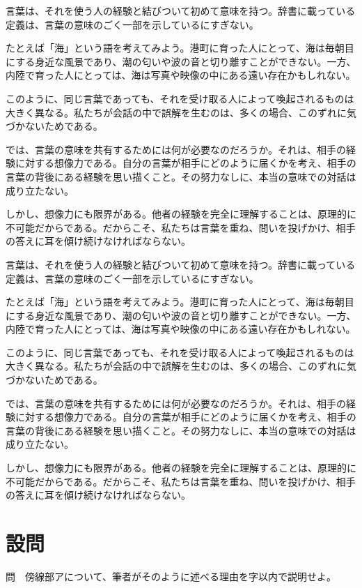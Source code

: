\documentclass[tate,paper=b5,fontsize=10pt,twocolumn]{jlreq}
\begin{document}
言葉は、それを使う人の経験と結びついて初めて意味を持つ。辞書に載っている定義は、言葉の意味のごく一部を示しているにすぎない。

たとえば「海」という語を考えてみよう。港町に育った人にとって、海は毎朝目にする身近な風景であり、潮の匂いや波の音と切り離すことができない。一方、内陸で育った人にとっては、海は写真や映像の中にある遠い存在かもしれない。

このように、同じ言葉であっても、それを受け取る人によって喚起されるものは大きく異なる。私たちが会話の中で誤解を生むのは、多くの場合、このずれに気づかないためである。

では、言葉の意味を共有するためには何が必要なのだろうか。それは、相手の経験に対する想像力である。自分の言葉が相手にどのように届くかを考え、相手の言葉の背後にある経験を思い描くこと。その努力なしに、本当の意味での対話は成り立たない。

しかし、想像力にも限界がある。他者の経験を完全に理解することは、原理的に不可能だからである。だからこそ、私たちは言葉を重ね、問いを投げかけ、相手の答えに耳を傾け続けなければならない。

言葉は、それを使う人の経験と結びついて初めて意味を持つ。辞書に載っている定義は、言葉の意味のごく一部を示しているにすぎない。

たとえば「海」という語を考えてみよう。港町に育った人にとって、海は毎朝目にする身近な風景であり、潮の匂いや波の音と切り離すことができない。一方、内陸で育った人にとっては、海は写真や映像の中にある遠い存在かもしれない。

このように、同じ言葉であっても、それを受け取る人によって喚起されるものは大きく異なる。私たちが会話の中で誤解を生むのは、多くの場合、このずれに気づかないためである。

では、言葉の意味を共有するためには何が必要なのだろうか。それは、相手の経験に対する想像力である。自分の言葉が相手にどのように届くかを考え、相手の言葉の背後にある経験を思い描くこと。その努力なしに、本当の意味での対話は成り立たない。

しかし、想像力にも限界がある。他者の経験を完全に理解することは、原理的に不可能だからである。だからこそ、私たちは言葉を重ね、問いを投げかけ、相手の答えに耳を傾け続けなければならない。

\section*{設問}

\begin{tcolorbox}[colback=white,arc=0pt,boxrule=0.4pt,left=2pt,right=2pt]
問　傍線部アについて、筆者がそのように述べる理由を字以内で説明せよ。
\end{tcolorbox}
\end{document}
